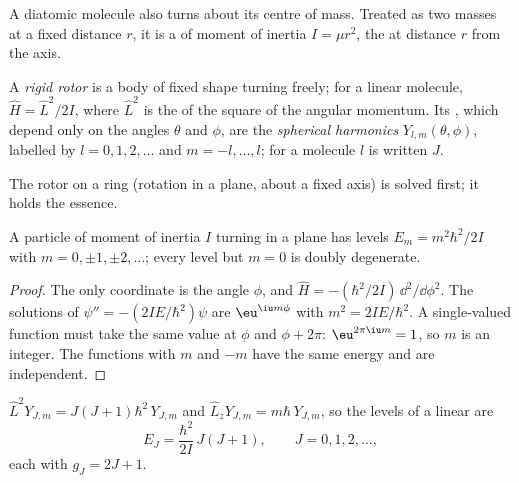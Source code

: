 A diatomic molecule also turns about its centre of mass. Treated as two
masses at a fixed distance $r$, it is a  of moment of inertia
$I = \mu r^2$, the  at distance $r$ from the axis.

\begin{definition}\label{def:b3:quantum-model-systems:rotor}
A \emph{rigid rotor} is a body of fixed shape turning
freely; for a linear molecule, $\hat H = \hat L^2/2I$, where $\hat L^2$ is the
 of the square of the angular momentum. Its , which
depend only on the angles $\theta$ and $\phi$, are the \emph{spherical
harmonics} $Y_{l,m}(\theta,\phi)$, labelled by $l =
0, 1, 2, \dots$ and $m = -l, \dots, l$; for a molecule $l$ is written $J$.
\end{definition}

The rotor on a ring (rotation in a plane, about a fixed axis) is solved
first; it holds the essence.

\begin{theorem}\label{thm:b3:quantum-model-systems:ring}
A particle of moment of inertia $I$ turning in a plane has levels
$E_m = m^2\hbar^2/2I$ with $m = 0, \pm1, \pm2, \dots$; every level but $m = 0$
is doubly degenerate.
\end{theorem}

\begin{proof}
The only coordinate is the angle $\phi$, and $\hat H = -(\hbar^2/2I)\,
\dd^2/\dd\phi^2$. The solutions of $\psi'' = -(2IE/\hbar^2)\psi$ are $\eu^{\iu
m\phi}$ with $m^2 = 2IE/\hbar^2$. A single-valued function must take the same
value at $\phi$ and $\phi + 2\pi$: $\eu^{2\pi\iu m} = 1$, so $m$ is an integer.
The functions with $m$ and $-m$ have the same energy and are independent.
\end{proof}

\begin{theorem}\label{thm:b3:quantum-model-systems:rotor}
$\hat L^2Y_{J,m} = J(J+1)\hbar^2\,Y_{J,m}$ and $\hat L_zY_{J,m} = m\hbar\,
Y_{J,m}$, so the levels of a linear  are
\[
E_J = \frac{\hbar^2}{2I}\,J(J+1), \qquad J = 0, 1, 2, \dots,
\]
each with  $g_J = 2J + 1$.
\end{theorem}
\admitted

